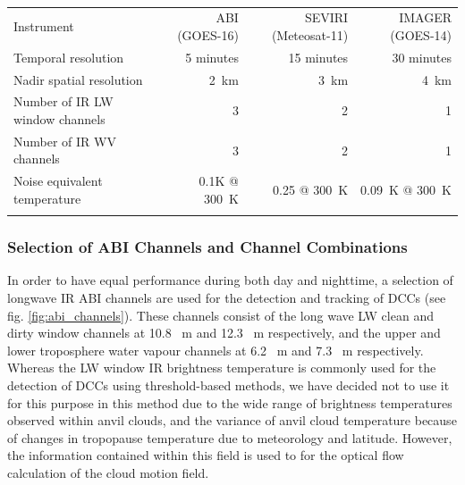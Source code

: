 \documentclass[amt, manuscript]{copernicus}
\begin{document}
\begin{table}[t]
\caption{}
\label{table:abi_comparison}
\begin{tabular}{lrrr}
\tophline
Instrument                      & ABI (GOES-16) & SEVIRI (Meteosat-11) & IMAGER (GOES-14) \\
\middlehline
Temporal resolution             & 5 minutes     & 15 minutes   & 30 minutes       \\
Nadir spatial resolution        & 2~km          & 3~km         & 4~km             \\
Number of IR LW window channels & 3             & 2            & 1                \\
Number of IR WV channels        & 3             & 2            & 1                \\
Noise equivalent temperature    & 0.1K @ 300~K  & 0.25 @ 300~K & 0.09~K @ 300~K       \\
\bottomhline
\end{tabular}
\end{table}

\subsubsection{Selection of ABI Channels and Channel Combinations}

In order to have equal performance during both day and nighttime, a selection of longwave IR ABI channels are used for the detection and tracking of DCCs (see fig. \ref{fig:abi_channels}). 
These channels consist of the long wave LW clean and dirty window channels at 10.8 \unit{\mu m} and 12.3 \unit{\mu m} respectively, and the upper and lower troposphere water vapour channels at 6.2 \unit{\mu m} and 7.3 \unit{\mu m} respectively.
Whereas the LW window IR brightness temperature is commonly used for the detection of DCCs using threshold-based methods, we have decided not to use it for this purpose in this method due to the wide range of brightness temperatures observed within anvil clouds, and the variance of anvil cloud temperature because of changes in tropopause temperature due to meteorology and latitude.
However, the information contained within this field is used to for the optical flow calculation of the cloud motion field.
\end{document}
